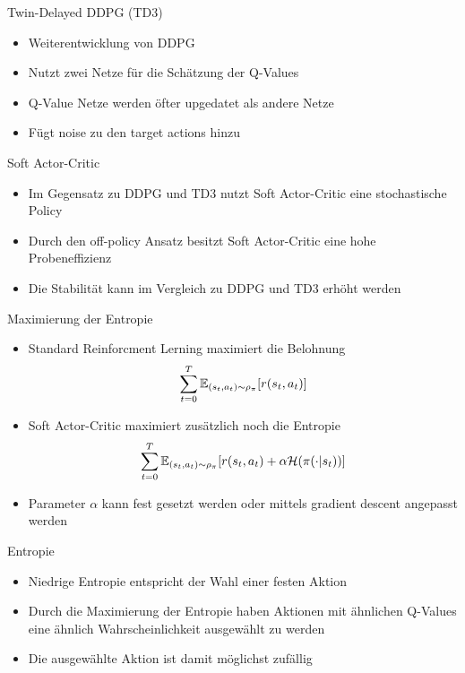 \begin{frame}{Twin-Delayed DDPG (TD3)}
	\begin{itemize}
		\item Weiterentwicklung von DDPG
		\item Nutzt zwei Netze für die Schätzung der Q-Values
		\item Q-Value Netze werden öfter upgedatet als andere Netze
		\item Fügt noise zu den target actions hinzu
	\end{itemize} 
\end{frame}

\begin{frame}{Soft Actor-Critic}
	\begin{itemize}
		\item Im Gegensatz zu DDPG und TD3 nutzt Soft Actor-Critic eine stochastische Policy
		\item Durch den off-policy Ansatz besitzt Soft Actor-Critic eine hohe Probeneffizienz 
		\item Die Stabilität kann im Vergleich zu DDPG und TD3 erhöht werden 
	\end{itemize} 
\end{frame}

\begin{frame}{Maximierung der Entropie}
	\begin{itemize}
		\item Standard Reinforcment Lerning maximiert die Belohnung
		\begin{equation}
			\sum_{t=0}^T \mathbb{E}_{(s_t,a_t)\sim\rho_\pi}[{\mathnormal{r}(s_t,a_t)}] \notag
		\end{equation}
		\item Soft Actor-Critic maximiert zusätzlich noch die Entropie
		\begin{equation}
			\sum_{t=0}^T \mathbb{E}_{(s_t,a_t)\sim\rho_\pi}[{\mathnormal{r}(s_t,a_t)} + \alpha \mathcal{H}(\pi(\cdot|s_t))] \notag
		\end{equation}
	\item Parameter $\alpha$ kann fest gesetzt werden oder mittels gradient descent angepasst werden
	\end{itemize} 
\end{frame}

\begin{frame}{Entropie}
	\begin{itemize}
		\item Niedrige Entropie entspricht der Wahl einer festen Aktion
		\item Durch die Maximierung der Entropie haben Aktionen mit ähnlichen Q-Values eine ähnlich Wahrscheinlichkeit ausgewählt zu werden
		\item Die ausgewählte Aktion ist damit möglichst zufällig
	\end{itemize} 
\end{frame}

